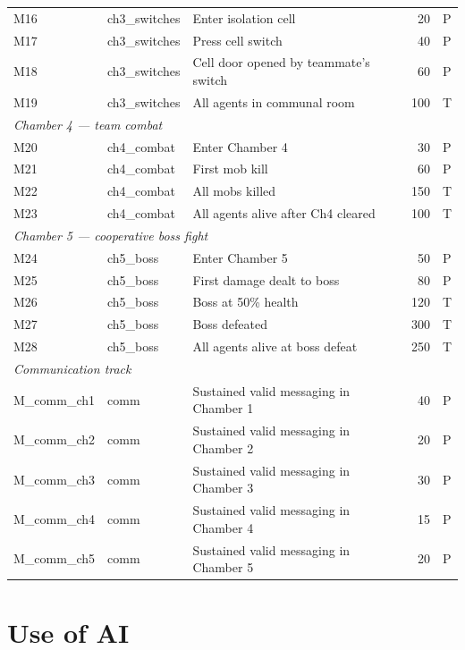 \documentclass{article}
\theoremstyle{plain}
\theoremstyle{definition}
\theoremstyle{remark}
\begin{document}
\begin{table}[t]
\begin{tabular}{lllrl}
M16 & ch3\_switches & Enter isolation cell                     & 20   & P \\
M17 & ch3\_switches & Press cell switch                        & 40   & P \\
M18 & ch3\_switches & Cell door opened by teammate's switch    & 60   & P \\
M19 & ch3\_switches & All agents in communal room              & 100  & T \\
\midrule
\multicolumn{5}{l}{\emph{Chamber 4 --- team combat}} \\
M20 & ch4\_combat   & Enter Chamber 4                          & 30   & P \\
M21 & ch4\_combat   & First mob kill                           & 60   & P \\
M22 & ch4\_combat   & All mobs killed                          & 150  & T \\
M23 & ch4\_combat   & All agents alive after Ch4 cleared       & 100  & T \\
\midrule
\multicolumn{5}{l}{\emph{Chamber 5 --- cooperative boss fight}} \\
M24 & ch5\_boss     & Enter Chamber 5                          & 50   & P \\
M25 & ch5\_boss     & First damage dealt to boss               & 80   & P \\
M26 & ch5\_boss     & Boss at 50\% health                      & 120  & T \\
M27 & ch5\_boss     & Boss defeated                            & 300  & T \\
M28 & ch5\_boss     & All agents alive at boss defeat          & 250  & T \\
\midrule
\multicolumn{5}{l}{\emph{Communication track}} \\
M\_comm\_ch1 & comm  & Sustained valid messaging in Chamber 1   & 40   & P \\
M\_comm\_ch2 & comm  & Sustained valid messaging in Chamber 2   & 20   & P \\
M\_comm\_ch3 & comm  & Sustained valid messaging in Chamber 3   & 30   & P \\
M\_comm\_ch4 & comm  & Sustained valid messaging in Chamber 4   & 15   & P \\
M\_comm\_ch5 & comm  & Sustained valid messaging in Chamber 5   & 20   & P \\
\bottomrule
\end{tabular}
\end{table}


\section{Use of AI}
\end{document}
